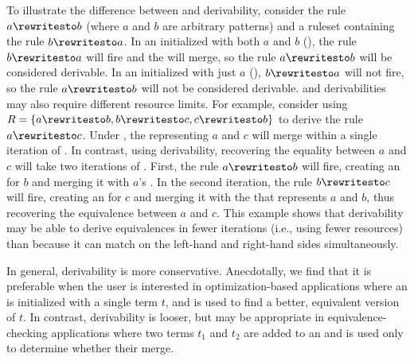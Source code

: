 To illustrate the difference between \lhs and \lhsandrhs derivability,
  consider the rule $a \rewritesto b$
  (where $a$ and $b$ are arbitrary patterns) and a ruleset containing
  the rule $b \rewritesto a$.
In an \egraph initialized with both $a$ and $b$ (\lhsandrhs), the rule
  $b \rewritesto a$ will fire and the \eclasses will merge, so the
  rule $a \rewritesto b$ will be considered derivable.
In an \egraph initialized with just $a$ (\lhs), $b \rewritesto a$
  will not fire, so the rule $a \rewritesto b$ will not be considered
  derivable.
\lhs and \lhsandrhs derivabilities may also require different resource
  limits.
For example, consider using
  $R = \{a \rewritesto b, b \rewritesto c, c \rewritesto b \}$ to
  derive the rule $a \rewritesto c$.
Under \lhsandrhs, the \eclasses representing $a$ and $c$ will
  merge within a single iteration of \eqsat.
In contrast, using \lhs derivability, recovering the equality between $a$ and
  $c$ will take two iterations of \eqsat.
First, the rule $a \rewritesto b$ will fire, creating an \eclass for
  $b$ and merging it with $a$'s \eclass.
In the second iteration, the rule $b \rewritesto c$ will fire, creating
  an \eclass for $c$ and merging it with the \eclass that represents
  $a$ and $b$, thus recovering the equivalence between $a$ and $c$.
This example shows that \lhsandrhs derivability may be able to derive equivalences
  in fewer iterations (i.e., using fewer resources) than \lhs because it can
  match on the left-hand and right-hand sides simultaneously.

In general, \lhs derivability is more conservative.
Anecdotally, we find that it is preferable
  when the user is interested in optimization-based
  \eqsat applications where an \egraph is initialized
  with a single term $t$, and \eqsat is used to find
  a better, equivalent version of $t$.
In contrast, \lhsandrhs derivability is looser,
  but may be appropriate in equivalence-checking
  \eqsat applications where two terms $t_1$ and $t_2$
  are added to an \egraph and \eqsat is used only to
  determine whether their \eclasses merge.

